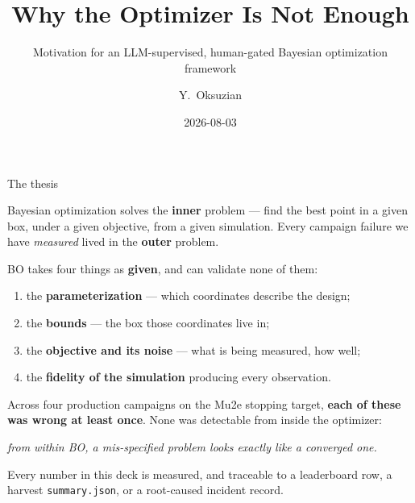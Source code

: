 \documentclass[aspectratio=169,10pt]{beamer}
\title[Why LLM + BO]{Why the Optimizer Is Not Enough}
\subtitle{Motivation for an LLM-supervised, human-gated Bayesian optimization framework}
\author{Y.\ Oksuzian}
\institute[Mu2e autoresearch]{Mu2e --- Phase-I Genesis proposal}
\date{2026-08-03}
\begin{document}
\begin{frame}
\titlepage
\end{frame}

\begin{frame}{The thesis}
\begin{block}{}
Bayesian optimization solves the \textbf{inner} problem --- find the best point in a
given box, under a given objective, from a given simulation. Every campaign failure
we have \emph{measured} lived in the \textbf{outer} problem.
\end{block}
\vspace{0.6em}
BO takes four things as \textbf{given}, and can validate none of them:
\vspace{0.3em}
\begin{enumerate}
  \item the \textbf{parameterization} --- which coordinates describe the design;
  \item the \textbf{bounds} --- the box those coordinates live in;
  \item the \textbf{objective and its noise} --- what is being measured, how well;
  \item the \textbf{fidelity of the simulation} producing every observation.
\end{enumerate}
\vspace{0.6em}
Across four production campaigns on the Mu2e stopping target, \textbf{each of these was
wrong at least once}. None was detectable from inside the optimizer:
\vspace{0.2em}
\begin{center}
\emph{from within BO, a mis-specified problem looks exactly like a converged one.}
\end{center}
\vspace{0.4em}
\footnotesize
Every number in this deck is measured, and traceable to a leaderboard row, a harvest
\texttt{summary.json}, or a root-caused incident record.
\end{frame}
\end{document}
